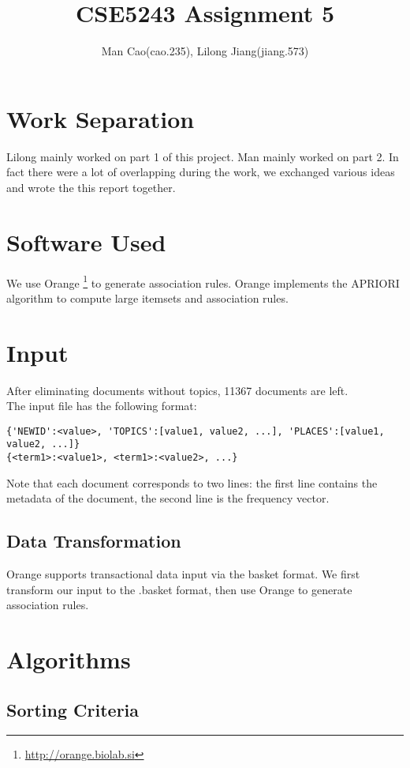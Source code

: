 \documentclass{article}
\begin{document}
\title{CSE5243 Assignment 5}
\author{Man Cao(cao.235), Lilong Jiang(jiang.573)}
\maketitle

\section{Work Separation}
Lilong mainly worked on part 1 of this project. Man mainly worked on
part 2. In fact there were a lot of overlapping during the
work, we exchanged various ideas and wrote the this report together.

\section{Software Used}
We use Orange \footnote{\url{http://orange.biolab.si}} to generate association
rules.
Orange implements the APRIORI algorithm to compute large itemsets and association
rules.

\section{Input}
After eliminating documents without topics, 11367 documents are left.\\
The input file has the following format:
\begin{verbatim}
{'NEWID':<value>, 'TOPICS':[value1, value2, ...], 'PLACES':[value1, value2, ...]}
{<term1>:<value1>, <term1>:<value2>, ...}
\end{verbatim}
Note that each document corresponds to two lines: the first line contains the
metadata of the document, the second line is the frequency vector.

\subsection{Data Transformation}
Orange supports transactional data input via the basket format. We first
transform our input to the .basket format, then use Orange to generate
association rules.

\section{Algorithms}
\subsection{Sorting Criteria}
\end{document}
